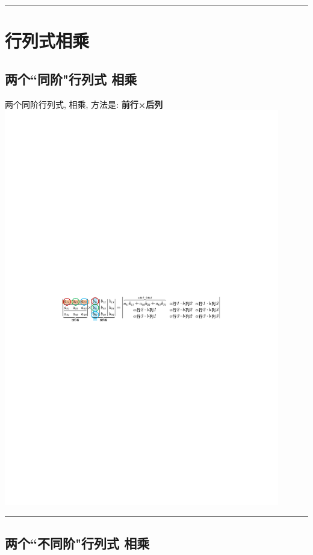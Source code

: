 \documentclass[UTF8]{ctexart}
\begin{document}
	

	\hrule

	\section{行列式相乘}
	
	\subsection{两个``同阶"行列式 相乘}
	
	两个同阶行列式, 相乘, 方法是:  \textbf{前行×后列} \\	
\includegraphics[width=0.9\textwidth]{img/0015.pdf}


\hrule


	
	\subsection{两个``不同阶"行列式 相乘}
	
\end{document}
